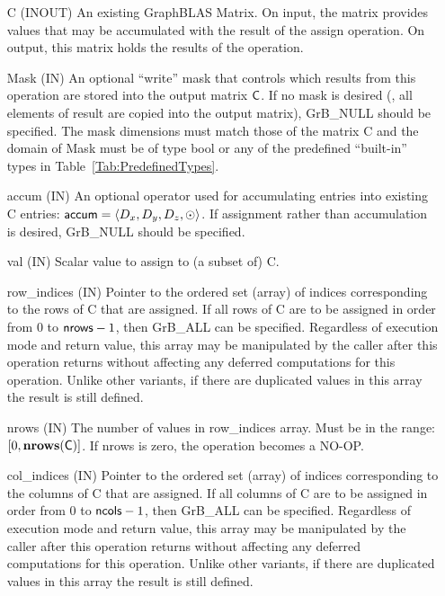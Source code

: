 \begin{itemize}[leftmargin=1.1in]
    \item[{\sf C}]    ({\sf INOUT}) An existing GraphBLAS Matrix.  On input,
    the matrix provides values that may be accumulated with the result of the
    assign operation.  On output, this matrix holds the results of the
    operation.

    \item[{\sf Mask}]  ({\sf IN}) An optional ``write'' mask that controls which
    results from this operation are stored into the output matrix
    ${\sf C}$.  If no mask is desired (\ie, all elements
    of result are copied into the output matrix), {\sf GrB\_NULL}
    should be specified. The mask dimensions must match those of the
    matrix {\sf C} and the domain of {\sf Mask} must be
    of type {\sf bool} or any of the predefined ``built-in'' types in
    Table~\ref{Tab:PredefinedTypes}.

    \item[{\sf accum}]    ({\sf IN}) An optional operator used for accumulating
    entries into existing {\sf C} entries: ${\sf accum} = \langle D_x,
    D_y, D_z,\odot \rangle$. If assignment rather than accumulation is
    desired, {\sf GrB\_NULL} should be specified.

    \item[{\sf val}]    ({\sf IN}) Scalar value to assign to (a subset of) {\sf C}.
    
    \item[{\sf row\_indices}]  ({\sf IN}) Pointer to the ordered set (array) of 
    indices corresponding to the rows of {\sf C} that are assigned.  If all rows
    of {\sf C} are to be assigned in order from $0$ to ${\sf nrows} - 1$, then 
    {\sf GrB\_ALL} can be specified.  Regardless of execution mode and return 
    value, this array may be manipulated by the caller after this operation 
    returns without affecting any deferred computations for this operation.  
    Unlike other variants, if there are duplicated values in this array the 
    result is still defined.

    \item[{\sf nrows}] ({\sf IN}) The number of values in {\sf row\_indices} 
	array. Must be in the range: $[0, \bold{nrows}({\sf C})]$.  If
    {\sf nrows} is zero, the operation becomes a NO-OP.

    \item[{\sf col\_indices}]  ({\sf IN}) Pointer to the ordered set (array) of 
    indices corresponding to the columns of {\sf C} that are assigned.  If all columns
    of {\sf C} are to be assigned in order from $0$ to ${\sf ncols} - 1$, then 
    {\sf GrB\_ALL} can be specified.  Regardless of execution mode and return 
    value, this array may be manipulated by the caller after this operation 
    returns without affecting any deferred computations for this operation.
    Unlike other variants, if there are duplicated values in this array the 
    result is still defined.


\end{itemize}
